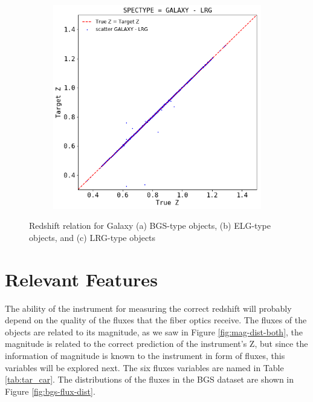 \begin{figure}[!htbp]
\begin{subfigure}[b]{0.5\textwidth}
		\caption{}
		\label{fig:ELG-z-truez}
	\end{subfigure}
	\begin{subfigure}[b]{0.5\textwidth}
		\includegraphics[width=1\linewidth]{TeX_files/Imagenes/LRG-z-truez}
		\caption{}
		\label{fig:LRG-z-truez}
	\end{subfigure}
	\caption{ Redshift relation for Galaxy (a) BGS-type objects, (b) ELG-type objects, and (c) LRG-type objects }
	\label{fig:GALAXY-SUB-z-truez}
\end{figure}

\section{Relevant Features}
The ability of the instrument for measuring the correct redshift will probably depend on the quality of the fluxes that the fiber optics receive. The fluxes of the objects are related to its magnitude, as we saw in Figure \ref{fig:mag-dist-both}, the magnitude is related to the correct prediction of the instrument's Z, but since the information of magnitude is known to the instrument in form of fluxes, this variables will be explored next. The six fluxes variables are named in Table \ref{tab:tar_car}.  The distributions of the fluxes in the BGS dataset are shown in Figure \ref{fig:bgs-flux-dist}.


